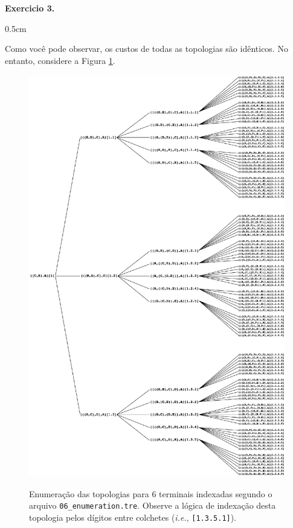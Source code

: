 \begin{refsection}
\begin{blackBlock}{\textbf{Exercicio 3.}}
\begin {myindentpar}{0.5cm}
\begin{enumerate}[\itshape i.]
\end{enumerate}
\end{myindentpar}

\end{blackBlock}

Como você pode observar, os custos de todas as topologias são idênticos. No entanto, considere a Figura \ref{tut3:fig:enumeration_indexed}.

  \begin{figure}[H]
      {\includegraphics[scale=0.80]{figures/tut3/enumeration_A4.eps}}
      {\caption[Enumeração indexada]{Enumeração das topologias para 6 terminais indexadas segundo o arquivo \texttt{06\_enumeration.tre}. Observe a lógica de indexação desta topologia pelos dígitos entre colchetes (\textit{i.e.}, \texttt{[1.3.5.1]}).}\label{tut3:fig:enumeration_indexed}}
  \end{figure}


\end{refsection}
